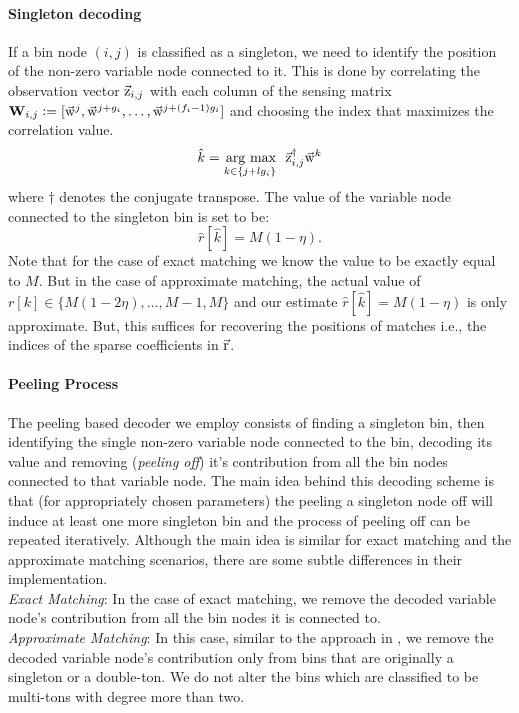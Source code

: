 \paragraph*{Singleton decoding}
 {\color{blue}{(Add a note on clustering scheme as extensions)}}If a bin node $(i,j)$ is classified as a singleton, we need to identify the position of the non-zero variable node connected to it. This is done by correlating the observation vector $\vec{\mathrm{z}}_{i,j}$ with each column of the sensing matrix  $\mathbf{W}_{i,j} \mathrel{\mathop:}= [\vec{\mathrm{w}}^{j},\vec{\mathrm{w}}^{j+g_i},\ldots,   \vec{\mathrm{w}}^{j+(f_i-1)g_i}]$ and choosing the index that maximizes the correlation value.
\begin{align*}
 \hat{k} = \underset{k\in\{j+l g_i\}}{\operatorname*{\,arg\ max}}~~ \vec{\mathrm{z}}^{\dagger}_{i,j} \vec{\mathrm{w}}^{k}
\end{align*}
where $\dagger$ denotes the conjugate transpose. The value of the variable node connected to the singleton bin is set to be:
 $$
 \hat{r}[\hat{k}]=M(1-\eta).
 $$
 Note that for the case of exact matching we know the value to be exactly equal to $M$. But in the case of approximate matching, the actual value of $r[k]\in\{M(1-2\eta),\ldots,M-1,M\}$ and our estimate $ \hat{r}[\hat{k}]=M(1-\eta)$ is only approximate. But, this suffices for recovering the positions of matches i.e., the indices of the sparse coefficients in $\vec{\mathrm{r}}$.			
\paragraph*{Peeling Process} The peeling based decoder we employ consists of finding a singleton bin, then identifying the single non-zero variable node connected to the bin, decoding its value and removing ({\it peeling off}) it's contribution from all the bin nodes connected to that variable node. The main idea behind this decoding scheme is that (for appropriately chosen parameters) the peeling a singleton node off will induce at least one more singleton bin and the process of peeling off can be repeated iteratively. Although the main idea is similar for exact matching and the approximate matching scenarios, there are some subtle differences in their implementation.\\
{\it Exact Matching}: In the case of exact matching, we remove the decoded variable node's contribution from all the bin nodes it is connected to.\\
{\it Approximate Matching}: In this case, similar to the approach in \cite{},  we remove the decoded variable node's contribution only from bins that are originally a singleton or a double-ton. We do not alter the bins which are classified to be multi-tons with degree more than two.

